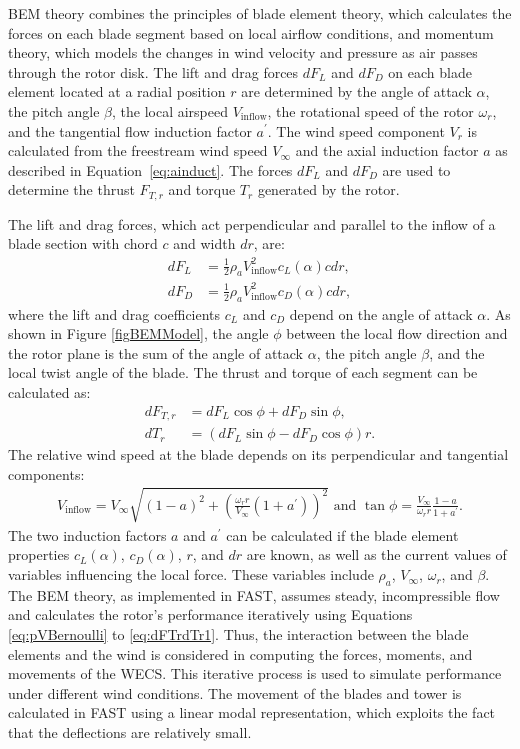 BEM theory combines the principles of blade element theory, which calculates the forces on each blade segment based on local airflow conditions, and momentum theory, which models the changes in wind velocity and pressure as air passes through the rotor disk. The lift and drag forces $dF_L$ and $dF_D$ on each blade element located at a radial position $r$ are determined by the angle of attack $\alpha$, the pitch angle $\beta$, the local airspeed $V_\text{inflow}$, the rotational speed of the rotor $\omega_r$, and the tangential flow induction factor $a^{\prime}$. The wind speed component $V_r$ is calculated from the freestream wind speed $V_{\infty}$ and the axial induction factor $a$ as described in Equation~\eqref{eq:ainduct}. The forces $dF_L$ and $dF_D$ are used to determine the thrust $F_{T,r}$ and torque $T_r$ generated by the rotor. 

The lift and drag forces, which act perpendicular and parallel to the inflow of a blade section with chord $c$ and width $dr$, are:
\begin{align} \label{eq:dFldFd}
    dF_L &= \frac{1}{2} \rho_a V^2_{\text{inflow}} c_L(\alpha)cdr,\\
    dF_D &= \frac{1}{2} \rho_a V^2_{\text{inflow}} c_D(\alpha)cdr,
\end{align}
where the lift and drag coefficients $c_L$ and $c_D$ depend on the angle of attack $\alpha$. As shown in Figure \ref{figBEMModel}, the angle $\phi$ between the local flow direction and the rotor plane is the sum of the angle of attack $\alpha$, the pitch angle $\beta$, and the local twist angle of the blade. The thrust and torque of each segment can be calculated as:
\begin{align} \label{eq:dFTrdTr}
    dF_{T,r} &= dF_{L}\cos\phi + dF_D \sin\phi,\\
    dT_r &= (dF_{L} \sin \phi - dF_D \cos\phi) r.
\end{align}
The relative wind speed at the blade depends on its perpendicular and tangential components:
\begin{align} \label{eq:dFTrdTr1}
    V_{\text{inflow}} = V_{\infty}\sqrt{(1-a)^2 + \left(\frac{\omega_{r}r}{ V_{\infty}}(1+a^{\prime})\right)^2}\text{ and } \tan \phi = \frac{V_{\infty}}{\omega_r r} \frac{1-a}{1+a^{\prime}}.
\end{align} %
The two induction factors $a$ and $a^{\prime}$ can be calculated if the blade element properties $c_L(\alpha)$, $c_D(\alpha)$, $r$, and $dr$ are known, as well as the current values of variables influencing the local force. These variables include $\rho_a$, $V_{\infty}$, $\omega_r$, and $\beta$. The BEM theory, as implemented in FAST, assumes steady, incompressible flow and calculates the rotor's performance iteratively using Equations \eqref{eq:pVBernoulli} to \eqref{eq:dFTrdTr1}. Thus, the interaction between the blade elements and the wind is considered in computing the forces, moments, and movements of the WECS. This iterative process is used to simulate performance under different wind conditions. The movement of the blades and tower is calculated in FAST using a linear modal representation, which exploits the fact that the deflections are relatively small.


